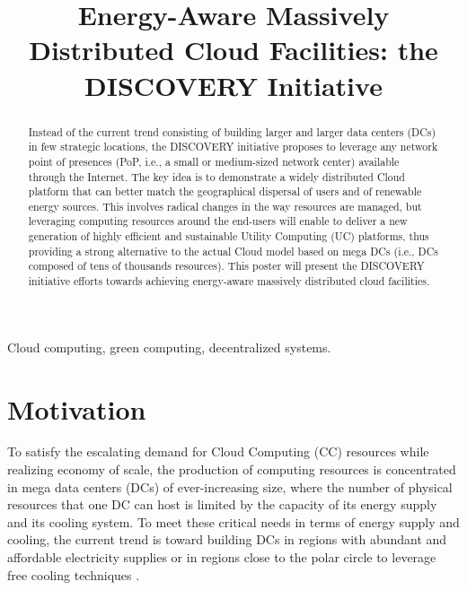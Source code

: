\documentclass[conference]{IEEEtran}
\begin{document}
\title{Energy-Aware Massively Distributed Cloud Facilities: the DISCOVERY Initiative}

\author{
}


\maketitle

\begin{abstract}
Instead of the current trend consisting of building larger and larger data centers (DCs) in few strategic locations, the DISCOVERY initiative proposes to leverage any network point of presences (PoP, i.e., a small or medium-sized network center) available through the Internet. The key idea is to demonstrate a widely distributed Cloud platform that can better match the geographical dispersal of users and of renewable energy sources. This involves radical changes in the way resources are managed, but leveraging computing resources around the end-users will enable to deliver a new generation of highly efficient and sustainable Utility Computing (UC) platforms, thus providing a strong alternative to the actual Cloud model based on mega DCs (i.e., DCs composed of tens of thousands resources). This poster will present the DISCOVERY initiative efforts towards achieving energy-aware massively distributed cloud facilities.
\end{abstract}

\begin{IEEEkeywords}
Cloud computing, green computing, decentralized systems.
\end{IEEEkeywords}

\IEEEpeerreviewmaketitle


\section{Motivation}

To satisfy the escalating demand for Cloud Computing (CC) resources while
realizing economy of scale, the production of computing resources is
concentrated in mega data centers (DCs) of ever-increasing size, where
the number of physical resources that one DC can host is limited by
the capacity of its energy supply and its cooling system. To
meet these critical needs in terms of energy supply and cooling, the
current trend is toward building DCs in regions with abundant and
affordable electricity supplies or in regions close to the polar
circle to leverage free cooling techniques \cite{greenpeace:2013}.
\end{document}
